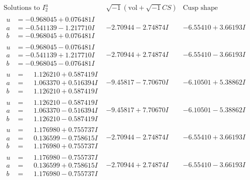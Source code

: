 \documentclass[1p]{elsarticle_modified}
\theoremstyle{definition}
\newcommand{\I}{\sqrt{-1}}
\begin{document}
$$\begin{array}{c|c|c}  
\text{Solutions to }I^u_{2}& \I (\text{vol} + \sqrt{-1}CS) & \text{Cusp shape}\\
 \hline 
\begin{aligned}
u &= -0.968045 + 0.076481 I \\
a &= -0.541139 - 1.217710 I \\
b &= -0.968045 + 0.076481 I\end{aligned}
 & -2.70944 - 2.74874 I & -6.55410 + 3.66193 I \\ \hline\begin{aligned}
u &= -0.968045 - 0.076481 I \\
a &= -0.541139 + 1.217710 I \\
b &= -0.968045 - 0.076481 I\end{aligned}
 & -2.70944 + 2.74874 I & -6.55410 - 3.66193 I \\ \hline\begin{aligned}
u &= \phantom{-}1.126210 + 0.587419 I \\
a &= \phantom{-}1.063370 + 0.516394 I \\
b &= \phantom{-}1.126210 + 0.587419 I\end{aligned}
 & -9.45817 - 7.70670 I & -6.10501 + 5.38862 I \\ \hline\begin{aligned}
u &= \phantom{-}1.126210 - 0.587419 I \\
a &= \phantom{-}1.063370 - 0.516394 I \\
b &= \phantom{-}1.126210 - 0.587419 I\end{aligned}
 & -9.45817 + 7.70670 I & -6.10501 - 5.38862 I \\ \hline\begin{aligned}
u &= \phantom{-}1.176980 + 0.755737 I \\
a &= \phantom{-}0.136599 - 0.758615 I \\
b &= \phantom{-}1.176980 + 0.755737 I\end{aligned}
 & -2.70944 - 2.74874 I & -6.55410 + 3.66193 I \\ \hline\begin{aligned}
u &= \phantom{-}1.176980 - 0.755737 I \\
a &= \phantom{-}0.136599 + 0.758615 I \\
b &= \phantom{-}1.176980 - 0.755737 I\end{aligned}
 & -2.70944 + 2.74874 I & -6.55410 - 3.66193 I \\ \hline\begin{aligned}

\end{aligned}
\end{array}$$
\end{document}
